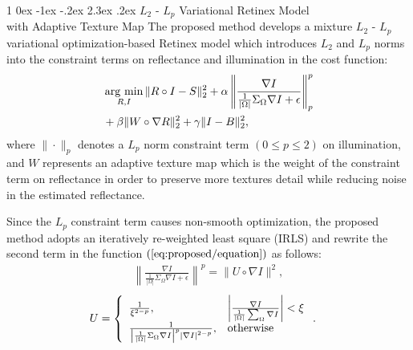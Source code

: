 \documentclass[a4paper,twocolumn,10pt]{article}
\makeatletter
\newcommand{\argmin}{\mathop{\rm arg~min}\limits}
\renewcommand{\section}{%
  \@startsection{section}%
   {1}%
   {\z@}%
   {0ex \@plus -1ex \@minus -.2ex}%
   {2.3ex \@plus.2ex}%
   {\normalfont\large\bfseries}%
}%
\makeatother
\begin{document}
\section{$L_{2}$ - $L_{p}$ Variational Retinex Model \\ with Adaptive Texture Map}
\vspace{-0.3cm}
The proposed method develops a mixture $L_{2}$ - $L_{p}$ variational optimization-based Retinex model which introduces $L_{2}$ and $L_{p}$ norms into the constraint terms on reflectance and illumination in the cost function:
\vspace{-0.25cm}
\begin{eqnarray}
\begin{split}
	&\argmin_{R, I} \|R \circ I - S\|_{2}^{2} + \alpha \left \|\frac{\nabla{I}}{\frac{1}{|\Omega|}\Sigma_{\Omega}\nabla{I}+\epsilon}\right\|_{p}^{p} \\
	& + \beta \|W \circ \nabla{R}\|_{2}^{2} + \gamma \|I - B\|_{2}^{2}, \label{eq:proposed/equation}
\end{split}
\vspace{-0.1cm}
\end{eqnarray}
where $\| \cdot \|_{p}$ denotes a $L_{p}$ norm constraint term $(0 \leq p \leq 2)$ on illumination, and $W$ represents an adaptive texture map which is the weight of the constraint term on reflectance in order to preserve more textures detail while reducing noise in the estimated reflectance.\par 
Since the $L_{p}$ constraint term causes non-smooth optimization, the proposed method adopts an iteratively re-weighted least square (IRLS) and rewrite the second term in the function $(\ref{eq:proposed/equation})$ as follows:
\vspace{-0.2cm}
\begin{eqnarray}
\left \|\frac{\nabla{I}}{\frac{1}{|\Omega|}\Sigma_{\Omega}\nabla{I}+\epsilon}\right\|^{p} = \|U \circ \nabla{I}\|^{2}, \label{eq:approximation}
\end{eqnarray}
\vspace{-0.5cm}
\begin{align}
U &= \left \{
  	\begin{array}{ll}
  	\frac{1}{\xi^{2-p}}, 
  	& \left |\frac{\nabla{I}}{\frac{1}{|\Omega|} \sum_{\Omega} \nabla{I} } \right| < \xi\\
  	\frac{1}{\left |\frac{1}{|\Omega|}\Sigma_{\Omega} \nabla{I} \right|^{p} \left |\nabla{I} \right|^{2-p}},
  	& \rm{otherwise}
  	\end{array}
\right. . \label{eq:lp_shape}
\end{align}\par
\end{document}
